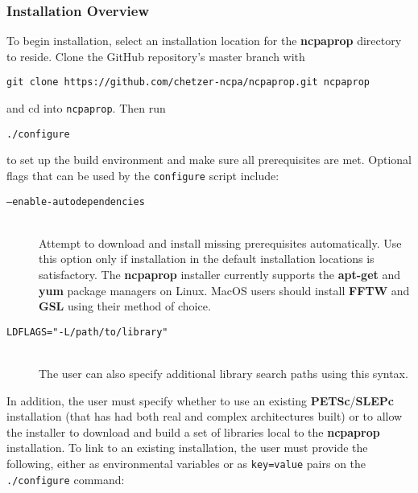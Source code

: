 \subsubsection{Installation Overview}

To begin installation, select an installation location for the \textbf{ncpaprop} directory to reside.  Clone the GitHub repository's master branch with

\texttt{git clone https://github.com/chetzer-ncpa/ncpaprop.git ncpaprop}

\noindent
and cd into \texttt{ncpaprop}.  Then run

\texttt{./configure}

\noindent
to set up the build environment and make sure all prerequisites are met.  Optional flags that can be used by the \texttt{configure} script include:

\begin{description}
\item[\texttt{--enable-autodependencies}]\hfill \\
\noindent
Attempt to download and install missing prerequisites automatically. Use this option only if installation in the default installation locations is satisfactory. The \textbf{ncpaprop} installer currently supports the \textbf{apt-get} and \textbf{yum} package managers on Linux.  MacOS users should install \textbf{FFTW} and \textbf{GSL} using their method of choice.

\item[\texttt{LDFLAGS="-L/path/to/library"}]\hfill \\
\noindent
The user can also specify additional library search paths using this syntax.
\end{description}

\noindent In addition, the user must specify whether to use an existing \textbf{PETSc}/\textbf{SLEPc} installation (that has had both real and complex architectures built) or to allow the installer to download and build a set of libraries local to the \textbf{ncpaprop} installation.  To link to an existing installation, the user must provide the following, either as environmental variables or as \texttt{key=value} pairs on the \texttt{./configure} command:

